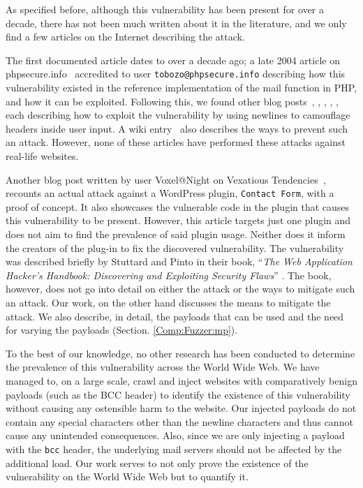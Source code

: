 As specified before, although this vulnerability has been present for over a decade, there has not been much written about it in the literature, and we only find a few articles on the Internet describing the attack.

The first documented article dates to over a decade ago; a late 2004 article on phpsecure.info~\cite{Tobozo} accredited to user \lstinline|tobozo@phpsecure.info| describing how this vulnerability existed in the reference implementation of the mail function in PHP, and how it can be exploited. Following this, we found other blog posts~\cite{Calin}, \cite{DK}, \cite{Injection2}, \cite{Nicol}, \cite{Pope}, each describing how to exploit the vulnerability by using newlines to camouflage headers inside user input. A wiki entry~\cite{Injection} also describes the ways to prevent such an attack. However, none of these articles have performed these attacks against real-life websites.

Another blog post written by user Voxel@Night on Vexatious Tendencies~\cite{Tendencies2014}, recounts an actual attack against a WordPress plugin, \texttt{Contact Form}, with a proof of concept\footnotemark. It also showcases the vulnerable code in the plugin that causes this vulnerability to be present. However, this article targets just one plugin and does not aim to find the prevalence of said plugin usage. Neither does it inform the creators of the plug-in to fix the discovered vulnerability.
The vulnerability was described briefly by Stuttard and Pinto in their book, ``\emph{The Web Application Hacker's Handbook: Discovering and Exploiting Security Flaws}'' \cite{stuttard2011web}. The book, however, does not go into detail on either the attack or the ways to mitigate such an attack. Our work, on the other hand discusses the means to mitigate the attack. We also describe, in detail, the payloads that can be used and the need for varying the payloads (Section. \ref{Comp:Fuzzer:mp}).

To the best of our knowledge, no other research has been conducted to determine the prevalence of this vulnerability across the World Wide Web. We have managed to, on a large scale, crawl and inject websites with comparatively benign payloads (such as the BCC header) to identify the existence of this vulnerability without causing any ostensible harm to the website. Our injected payloads do not contain any special characters other than the newline characters and thus cannot cause any unintended consequences. Also, since we are only injecting a payload with the \texttt{bcc} header, the underlying mail servers should not be affected by the additional load. Our work serves to not only prove the existence of the vulnerability on the World Wide Web but to quantify it.
